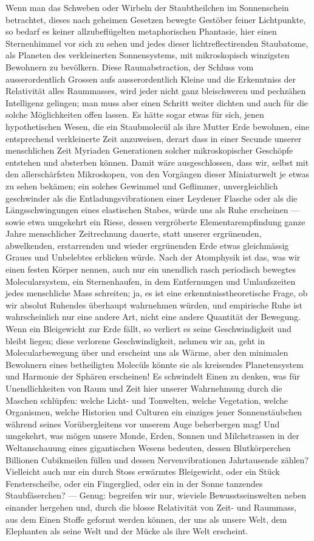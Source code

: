 Wenn man das Schweben oder Wirbeln der Staubtheilchen im Sonnenschein betrachtet, dieses nach geheimen Gesetzen bewegte Gestöber feiner Lichtpunkte, so bedarf es keiner allzubeflügelten metaphorischen Phantasie, hier einen Sternenhimmel  vor sich zu sehen und jedes dieser lichtreflectirenden Staubatome, als Planeten des verkleinerten Sonnensystems, mit mikroskopisch winzigsten Bewohnern zu bevölkern. Diese Raumabstraction, der Schluss vom ausserordentlich Grossen aufs ausserordentlich Kleine und die Erkenntniss der Relativität alles Raummasses, wird jeder nicht ganz bleischweren und pechzähen Intelligenz gelingen; man muss aber einen Schritt weiter dichten und auch für die  solche Möglichkeiten offen lassen. Es hätte sogar etwas für sich, jenen hypothetischen Wesen, die ein Staubmolecül als ihre Mutter Erde bewohnen, eine entsprechend verkleinerte Zeit anzuweisen, derart dass in einer Secunde unserer menschlichen Zeit Myriaden Generationen solcher mikroskopischer Geschöpfe entstehen und absterben können. Damit wäre ausgeschlossen, dass wir, selbst mit den allerschärfsten Mikroskopen, von den Vorgängen dieser Miniaturwelt je etwas zu sehen bekämen; ein solches Gewimmel und Geflimmer, unvergleichlich geschwinder als die Entladungsvibrationen einer Leydener Flasche oder als die Längsschwingungen eines elastischen Stabes, würde uns als Ruhe erscheinen — sowie etwa umgekehrt ein Riese, dessen vergröberte Elementarempfindung ganze Jahre menschlicher Zeitrechnung dauerte, statt unserer ergrünenden, abwelkenden, erstarrenden und wieder ergrünenden Erde etwas gleichmässig Graues und Unbelebtes erblicken würde. Nach der Atomphysik ist das, was wir einen festen Körper nennen, auch nur ein unendlich rasch periodisch bewegtes Molecularsystem, ein Sternenhaufen, in dem Entfernungen und Umlaufszeiten jedes menschliche Mass schreiten; ja, es ist eine erkenntnisstheoretische Frage, ob wir absolut Ruhendes überhaupt wahrnehmen würden, und empirische Ruhe ist wahrscheinlich nur eine andere Art, nicht eine andere Quantität der Bewegung. Wenn ein Bleigewicht zur Erde fällt, so verliert es seine Geschwindigkeit und bleibt liegen; diese verlorene Geschwindigkeit, nehmen wir an, geht in Molecularbewegung über und erscheint uns als Wärme, aber den minimalen Bewohnern eines betheiligten Molecüls könnte sie als kreisendes Planetensystem und Harmonie der Sphären erscheinen! Es schwindelt Einen zu denken, was für Unendlichkeiten von Raum und Zeit hier unserer Wahrnehmung durch die Maschen schlüpfen: welche Licht- und Tonwelten, welche Vegetation, welche Organismen, welche Historien und Culturen ein einziges jener Sonnenstäubchen während seines Vorübergleitens vor unserem Auge beherbergen mag! Und umgekehrt, was mögen unsere Monde, Erden, Sonnen und Milchstrassen in der Weltanschauung eines gigantischen Wesens bedeuten, dessen Blutkörperchen Billionen Cubikmeilen füllen und dessen Nervenvibrationen Jahrtausende zählen? Vielleicht auch nur ein durch Stoss erwärmtes Bleigewicht, oder ein Stück Fensterscheibe, oder ein Fingerglied, oder ein in der Sonne tanzendes Staubfäserchen? — Genug: begreifen wir nur, wieviele Bewusstseinswelten neben einander hergehen und, durch die blosse Relativität von Zeit- und Raummass, aus dem Einen Stoffe geformt werden können, der uns als unsere Welt, dem Elephanten als seine Welt und der Mücke als ihre Welt erscheint.
\par

